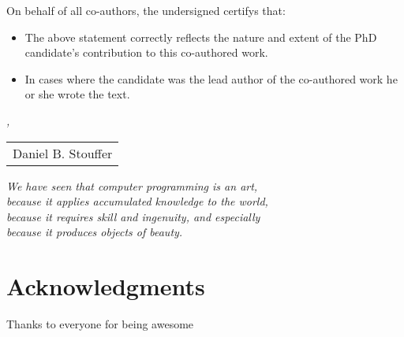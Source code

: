 On behalf of all co-authors, the undersigned certifys that:

\begin{itemize}
	\item The above statement correctly reflects the nature and extent of the PhD candidate's
    contribution to this co-authored work.
	\item In cases where the candidate was the lead author of the co-authored work he or she
    wrote the text.
\end{itemize}

\bigskip

\noindent\textit{\myLocation, \myTime}

\smallskip

\begin{flushright}
    \begin{tabular}{m{5cm}}
        \\ \hline
        \centering Daniel B. Stouffer \\
    \end{tabular}
\end{flushright}


\cleardoublepage

\begin{flushright}{\slshape
    We have seen that computer programming is an art, \\
    because it applies accumulated knowledge to the world, \\
    because it requires skill and ingenuity, and especially \\
    because it produces objects of beauty.} \\ \medskip
\end{flushright}



\bigskip
\setcounter{secnumdepth}{-1}
\begingroup
\let\clearpage\relax
\let\cleardoublepage\relax
\let\cleardoublepage\relax
\chapter{Acknowledgments}
Thanks to everyone for being awesome

\endgroup
\setcounter{secnumdepth}{3}

\clearpage
\begingroup
    \let\clearpage\relax
    \let\cleardoublepage\relax
    \listoffigures

